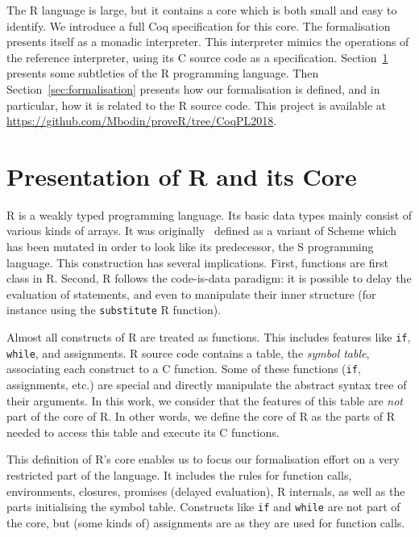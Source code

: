\documentclass[9pt, sigplan, natbib=false, screen=true]{acmart}
\newcommand\Coq{Coq}
\newcommand\R{R}
\newcommand\Cn{C}
\begin{document}
The \R{} language is large,
but it contains a core which is both small and easy to identify.
We introduce a full \Coq{} specification for this core.
The formalisation presents itself as a monadic interpreter.
This interpreter mimics the operations of the reference interpreter,
using its \Cn{} source code as a specification.
%
Section~\ref{sec:presentation} presents some subtleties of the \R{} programming language.
Then Section~\ref{sec:formalisation} presents how our formalisation is defined,
and in particular, how it is related to the \R{} source code.
This project is available at \url{https://github.com/Mbodin/proveR/tree/CoqPL2018}.


\section{Presentation of \R{} and its Core}
\label{sec:presentation}

\R{} is a weakly typed programming language.
Its basic data types mainly consist of various kinds of arrays.
It was originally~\parencite{ihaka1996r} defined as a variant of Scheme
which has been mutated in order to look like its predecessor,
the S programming language.
This construction has several implications.
First, functions are first class in \R{}.
Second, \R{} follows the code-is-data paradigm:
it is possible to delay the evaluation of statements,
and even to manipulate their inner structure
(for instance using the \texttt{substitute} \R{} function).

Almost all constructs of \R{} are treated as functions.
This includes features like \texttt{if}, \texttt{while},
and assignments.
\R{} source code contains a table,
the \emph{symbol table},
associating each construct to a \Cn{} function.
Some of these functions (\texttt{if}, assignments, etc.)
are special and directly manipulate the abstract syntax tree
of their arguments.
%
In this work,
we consider that the features of this table
are \emph{not} part of the core of \R{}.
In other words, we define the core of \R{}
as the parts of \R{} needed to access this table
and execute its \Cn{} functions.

This definition of \R{}'s core enables us to focus
our formalisation effort on a very restricted part of the language.
It includes the rules for function calls,
environments, closures, promises (delayed evaluation), \R{} internals,
as well as the parts initialising the symbol table.
Constructs like \texttt{if} and \texttt{while}
are not part of the core,
but (some kinds of) assignments are
as they are used for function calls.
\end{document}
